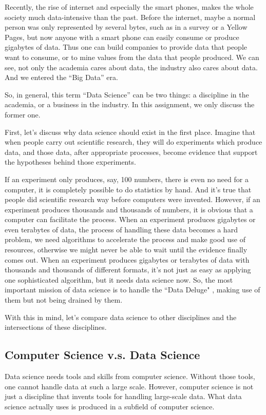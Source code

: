 Recently, the rise of internet and especially the smart phones, makes the whole society much data-intensive than the past.
Before the internet, maybe a normal person was only represented by several bytes, such as in a survey or a Yellow Pages, but now anyone with a smart phone can easily consume or produce gigabytes of data.
Thus one can build companies to provide data that people want to consume, or to mine values from the data that people produced.
We can see, not only the academia cares about data, the industry also cares about data.
And we entered the ``Big Data'' era.

So, in general, this term ``Data Science'' can be two things: a discipline in the academia, or a business in the industry.
In this assignment, we only discuss the former one.

First, let's discuss why data science should exist in the first place.
Imagine that when people carry out scientific research, they will do experiments which produce data, and those data, after appropriate processes, become evidence that support the hypotheses behind those experiments.

If an experiment only produces, say, 100 numbers, there is even no need for a computer, it is completely possible to do statistics by hand.
And it's true that people did scientific research way before computers were invented.
However, if an experiment produces thousands and thousands of numbers, it is obvious that a computer can facilitate the process.
When an experiment produces gigabytes or even terabytes of data, the process of handling these data becomes a hard problem, we need algorithms to accelerate the process and make good use of resources, otherwise we might never be able to wait until the evidence finally comes out.
When an experiment produces gigabytes or terabytes of data with thousands and thousands of different formats, it's not just as easy as applying one sophisticated algorithm, but it needs data science now. 
So, the most important mission of data science is to handle the ``Data Deluge" \cite{hey_data_2003}, making use of them but not being drained by them.

With this in mind, let's compare data science to other disciplines and the intersections of these disciplines.

\subsection*{Computer Science v.s. Data Science}

Data science needs tools and skills from computer science.
Without those tools, one cannot handle data at such a large scale.
However, computer science is not just a discipline that invents tools for handling large-scale data.
What data science actually uses is produced in a subfield of computer science.


